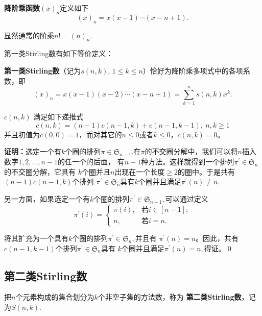 \begin{defi}
{\bf 降阶乘函数}$(x)_n$定义如下
$$(x)_n=x(x-1)\cdots(x-n+1).$$
\end{defi}

显然通常的阶乘$n!=(n)_n.$

第一类Stirling数有如下等价定义：

\begin{defi}
{\bf 第一类Stirling数}（记为$s(n,k)$, $1\leq k\leq
n$）恰好为降阶乘多项式中的各项系数，即
\begin{equation}
(x)_n=x(x-1)(x-2)\cdots(x-n+1)=\sum_{k=1}^n{s(n,k)x^k}.
\end{equation}
\end{defi}

\begin{thm}
$c(n,k)$ 满足如下递推式
$$c(n,k)=(n-1)c(n-1,k)+c(n-1,k-1),\  n,k\geq 1$$
并且初值为$c(0,0)=1$，而对其它的$n\leq 0$或者$k\leq 0$，$c(n,k)=0$。
\end{thm}

{\bf 证明：}选定一个有$k$个圈的排列$\pi\in\mathfrak{S}_{n-1}.$在$
\pi$的不交圈分解中，我们可以将$n$插入数字$1,2,\ldots,n-1$的任一个的后面，
有$n-1$种方法。这样就得到一个排列$\pi^{'}\in\mathfrak{S}_n$的不交圈分解，它具有
$k$个圈并且$n$出现在一个长度$\geq
2$的圈中。于是共有$(n-1)c(n-1,k)$个排列
$\pi^{'}\in\mathfrak{S}_n$具有$k$个圈并且满足$\pi^{'}(n)\neq n.$

另一方面，如果选定一个有$k$个圈的排列$\pi^{'}\in\mathfrak{S}_{n-1},$可以通过定义
  $$\pi^{'}(i)=\left\{\begin{array}{ll}
                          \pi(i), & \mbox{若}i\in[n-1]; \\
                          n, &\mbox{若} i=n.
                        \end{array}\right.
    $$

将其扩充为一个具有$k$个圈的排列$\pi^{'}\in\mathfrak{S}_n,$并且有
$\pi^{'}(n)=n$。因此，共有$c(n-1,k-1)$个排列$\pi^{'}\in\mathfrak{S}_n$具有
$k$个圈并且满足$\pi^{'}(n)=n,$得证。\qed

\subsection{第二类Stirling数}
\begin{defi}
把$n$个元素构成的集合划分为$k$个非空子集的方法数，称为{\bf
第二类Stirling数}，记为$S(n,k)$.
\end{defi}

